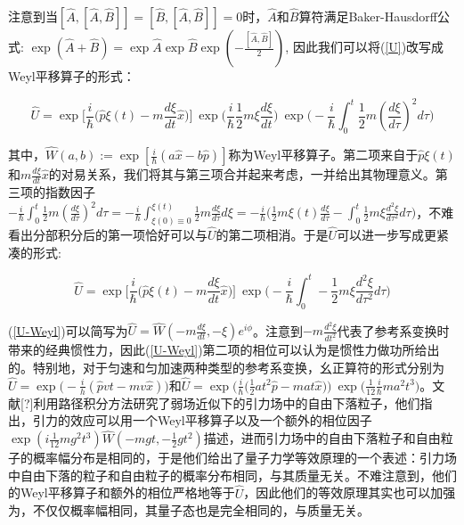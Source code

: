 \documentclass[a4paper]{article}
\begin{document}
        注意到当$[\hat{A}, [\hat{A}, \hat{B}]]=[\hat{B}, [\hat{A}, \hat{B}]]=0$时，$\hat{A}$和$\hat{B}$算符满足Baker-Hausdorff公式: $\exp(\hat{A}+\hat{B})=\exp\hat{A} \exp\hat{B} \exp(-\frac{[\hat{A}, \hat{B}]}{2})$, 因此我们可以将(\ref{U})改写成Weyl平移算子的形式：

        \begin{equation}
            \hat{U}=\exp\bigg[\frac{i}{\hbar}\bigg(\hat{p}\xi(t)-m\frac{d\xi}{dt}\hat{x} \bigg) \bigg]\ \exp\bigg(\frac{i}{\hbar}\frac{1}{2}m\xi\frac{d\xi}{dt} \bigg)\ \exp\bigg(-\frac{i}{\hbar}\int_0^t\frac{1}{2}m(\frac{d \xi}{d\tau})^2 d\tau \bigg)
        \end{equation}

        其中，$\hat{W}(a,b):=\exp[\frac{i}{\hbar}(a\hat{x}-b\hat{p})]$称为Weyl平移算子。第二项来自于$\hat{p}\xi(t)$和$m\frac{d\xi}{dt}\hat{x}$的对易关系，我们将其与第三项合并起来考虑，一并给出其物理意义。第三项的指数因子$-\frac{i}{\hbar}\int_0^t\frac{1}{2}m(\frac{d \xi}{d\tau})^2 d\tau = -\frac{i}{\hbar}\int_{\xi(0)\equiv 0}^{\xi(t)}\frac{1}{2}m\frac{d \xi}{d\tau} d\xi = -\frac{i}{\hbar}\bigg(\frac{1}{2}m\xi(t)\frac{d \xi}{d\tau}-\int_0^t\frac{1}{2}m\xi\frac{d^2\xi}{d\tau^2} d\tau\bigg)$，不难看出分部积分后的第一项恰好可以与$\hat{U}$的第二项相消。于是$\hat{U}$可以进一步写成更紧凑的形式:

        \begin{equation}\label{U-Weyl}
            \hat{U} = \exp\bigg[\frac{i}{\hbar}\bigg(\hat{p}\xi(t)-m\frac{d\xi}{dt}\hat{x} \bigg) \bigg]\ \exp\bigg( -\frac{i}{\hbar}\int_0^t-\frac{1}{2}m\xi\frac{d^2\xi}{d\tau^2} d\tau\bigg)
        \end{equation}

        (\ref{U-Weyl})可以简写为$\hat{U}=\hat{W}(-m\frac{d\xi}{dt},-\xi)e^{i\phi}$。注意到$-m\frac{d^2\xi}{dt^2}$代表了参考系变换时带来的经典惯性力，因此(\ref{U-Weyl})第二项的相位可以认为是惯性力做功所给出的。特别地，对于匀速和匀加速两种类型的参考系变换，幺正算符的形式分别为$\hat{U}=\exp\big(-\frac{i}{h}(\hat{p}vt-mv\hat{x})\big)$和$\hat{U}=\exp\big(\frac{i}{\hbar}\big(\frac{1}{2}at^2\hat{p}-mat\hat{x} \big)\big)\ \exp\big(\frac{1}{12}\frac{i}{\hbar}ma^2t^3\big)$。文献[?]利用路径积分方法研究了弱场近似下的引力场中的自由下落粒子，他们指出，引力的效应可以用一个Weyl平移算子以及一个额外的相位因子$\exp(i\frac{1}{12}mg^2t^3)\hat{W}(-mgt,-\frac{1}{2}gt^2)$描述，进而引力场中的自由下落粒子和自由粒子的概率幅分布是相同的，于是他们给出了量子力学等效原理的一个表述：引力场中自由下落的粒子和自由粒子的概率分布相同，与其质量无关。不难注意到，他们的Weyl平移算子和额外的相位严格地等于$\hat{U}$，因此他们的等效原理其实也可以加强为，不仅仅概率幅相同，其量子态也是完全相同的，与质量无关。
\end{document}
